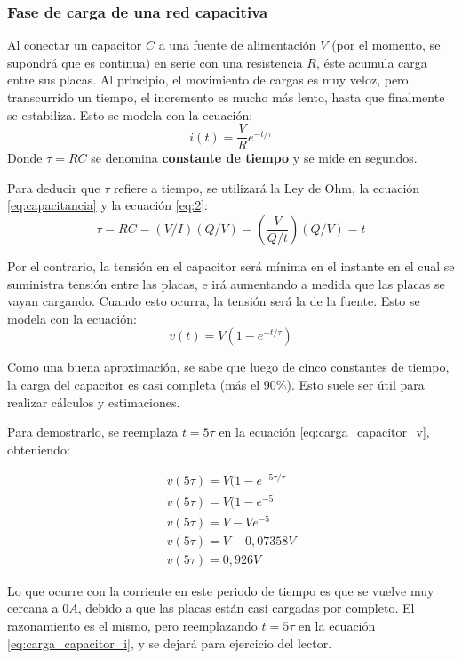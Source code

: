 \subsubsection{Fase de carga de una red capacitiva}
Al conectar un capacitor $C$ a una fuente de alimentación $V$ (por el momento, se supondrá que es continua) en serie con una resistencia $R$, éste acumula carga entre sus placas. Al principio, el movimiento de cargas es muy veloz, pero transcurrido un tiempo, el incremento es mucho más lento, hasta que finalmente se estabiliza. Esto se modela con la ecuación:
\begin{equation}
	\label{eq:carga_capacitor_i}
	i(t)=\frac{V}{R}e^{-t / \tau}
\end{equation}
Donde $\tau = RC $ se denomina \textbf{constante de tiempo} y se mide en segundos.

Para deducir que $\tau$ refiere a tiempo, se utilizará la Ley de Ohm, la ecuación \ref{eq:capacitancia} y la ecuación \ref{eq:2}: $$ \tau = RC = (V/I)(Q/V)=(\frac{V}{Q/t})(Q/V)=t$$

Por el contrario, la tensión en el capacitor será mínima en el instante en el cual se suministra tensión entre las placas, e irá aumentando a medida que las placas se vayan cargando. Cuando esto ocurra, la tensión será la de la fuente. Esto se modela con la ecuación:
\begin{equation}
	\label{eq:carga_capacitor_v}
	v(t)=V(1-e^{-t / \tau})
\end{equation}

Como una buena aproximación, se sabe que luego de cinco constantes de tiempo, la carga del capacitor es casi completa (más el 90\%). Esto suele ser útil para realizar cálculos y estimaciones.

Para demostrarlo, se reemplaza $t=5\tau$ en la ecuación \ref{eq:carga_capacitor_v}, obteniendo:

\begin{eqnarray*}
	v(5\tau)=V(1-e^{-5\tau / \tau} \\
	v(5\tau)=V(1-e^{-5} \\
	v(5\tau)=V-Ve^{-5} \\
	v(5\tau)=V-0,07358V  \\
	v(5\tau)=0,926V
\end{eqnarray*}

Lo que ocurre con la corriente en este periodo de tiempo es que se vuelve muy cercana a $0 A$, debido a que las placas están casi cargadas por completo. El razonamiento es el mismo, pero reemplazando $t=5\tau$ en la ecuación \ref{eq:carga_capacitor_i}, y se dejará para ejercicio del lector.

